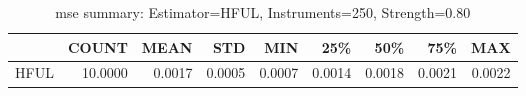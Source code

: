 \begin{table}[ht]
\centering
\caption{mse summary: Estimator=HFUL, Instruments=250, Strength=0.80}
\begin{tabular}{lrrrrrrrr}
\toprule
 & COUNT & MEAN & STD & MIN & 25\% & 50\% & 75\% & MAX \\
\midrule
HFUL & 10.0000 & 0.0017 & 0.0005 & 0.0007 & 0.0014 & 0.0018 & 0.0021 & 0.0022 \\
\bottomrule
\end{tabular}
\end{table}
